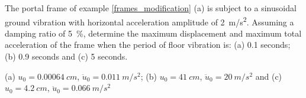 
\begin{Exercise}[label={frame_ground_acceleration}]
The portal frame of example \ref{frames_modification} (a) is subject to a sinusoidal ground vibration with horizontal acceleration amplitude of \SI{2}{m/s^2}. Assuming a damping ratio of \SI{5}{\%}, determine the maximum displacement and maximum total acceleration of the frame when the period of floor vibration is: (a) 0.1 seconds; (b) 0.9 seconds and (c) 5 seconds.

\begin{center}
\end{center}

\shortAnswer (a) $u_0 = \SI{0.00064}{cm}$, $\ddot{u}_0 = \SI{0.011}{m/s^2}$; (b) $u_0 = \SI{41}{cm}$, $\ddot{u}_0 = \SI{20}{m/s^2}$ and (c) $u_0 = \SI{4.2}{cm}$, $\ddot{u}_0 = \SI{0.066}{m/s^2}$
\end{Exercise}



